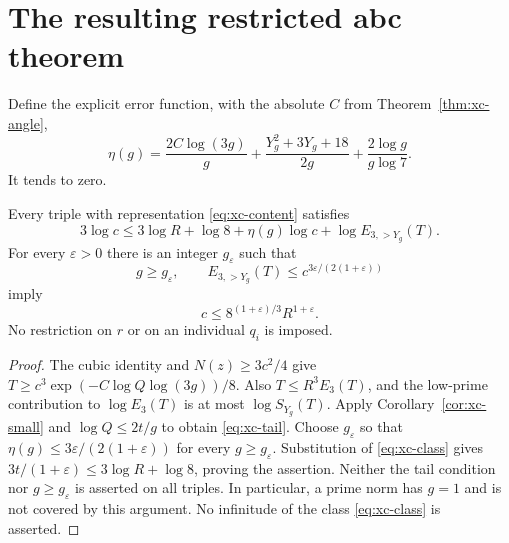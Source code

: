 \section{The resulting restricted abc theorem}
\label{sec:xc-stratum}
Define the explicit error function, with the absolute $C$ from
Theorem~\ref{thm:xc-angle},
\[
 \eta(g)=\frac{2C\log(3g)}g+
 \frac{Y_g^2+3Y_g+18}{2g}+\frac{2\log g}{g\log7}.
\]
It tends to zero.
\begin{theorem}\label{thm:xc-restricted}
Every triple with representation \eqref{eq:xc-content} satisfies
\begin{equation}\label{eq:xc-tail}
 3\log c\le3\log R+\log8+\eta(g)\log c
             +\log E_{3,>Y_g}(T).
\end{equation}
For every $\varepsilon>0$ there is an integer $g_\varepsilon$ such that
\begin{equation}\label{eq:xc-class}
 g\ge g_\varepsilon,\qquad
 E_{3,>Y_g}(T)\le c^{3\varepsilon/(2(1+\varepsilon))}
\end{equation}
imply
\[
 c\le8^{(1+\varepsilon)/3}R^{1+\varepsilon}.
\]
No restriction on $r$ or on an individual $q_i$ is imposed.
\end{theorem}
\begin{proof}
The cubic identity and $N(z)\ge3c^2/4$ give
$T\ge c^3\exp(-C\log Q\log(3g))/8$.
Also $T\le R^3E_3(T)$, and the low-prime contribution to $\log E_3(T)$
is at most $\log S_{Y_g}(T)$. Apply Corollary~\ref{cor:xc-small} and
$\log Q\le2t/g$ to obtain \eqref{eq:xc-tail}.
Choose $g_\varepsilon$ so that $\eta(g)\le3\varepsilon/(2(1+\varepsilon))$
for every $g\ge g_\varepsilon$. Substitution of \eqref{eq:xc-class} gives
$3t/(1+\varepsilon)\le3\log R+\log8$, proving the assertion.
Neither the tail condition nor $g\ge g_\varepsilon$ is asserted on all
triples. In particular, a prime norm has $g=1$ and is not covered by this
argument. No infinitude of the class \eqref{eq:xc-class} is asserted.
\end{proof}

